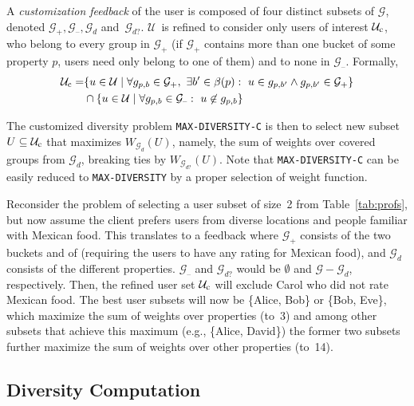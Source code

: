 A \emph{customization feedback} of the user is composed of four distinct subsets of $\mathcal{G}$, denoted $\mathcal{G}_{+},\mathcal{G}_{\textrm{--}},\mathcal{G}_{d}$ and~$\mathcal{G}_{d?}$. $\mathcal{U}$~is refined to consider only users of interest $\mathcal{U}_{\operatorname{c}}$, who belong to every group in  $\mathcal{G}_{+}$ (if $\mathcal{G}_{+}$ contains more than one bucket of some property $p$, users need only belong to one of them) and to none in $\mathcal{G}_{\textrm{--}}$. Formally,
\[\begin{split}
\mathcal{U}_{\operatorname{c}} = & \{u\in\mathcal{U}\mid\forall g_{p,b}\in \mathcal{G}_{+}, ~\exists b'\in \beta(p): ~u\in g_{p,b'} \wedge g_{p,b'} \in\mathcal{G}_{+}\} \\
& \cap  \{u\in\mathcal{U}\mid\forall g_{p,b}\in \mathcal{G}_{\textrm{--}} : ~u\not\in g_{p,b}\}
\end{split}\]

The customized diversity problem  \texttt{MAX-DIVERSITY-C} is then to select new subset $U\subseteq\mathcal{U}_{\operatorname{c}}$ that maximizes $W_{\mathcal{G}_{d}}(U)$, namely, the sum of weights over covered groups from  $\mathcal{G}_{d}$, breaking ties by $W_{\mathcal{G}_{d?}}(U)$. Note that \texttt{MAX-DIVERSITY-C} can be easily reduced to \texttt{MAX-DIVERSITY} by a proper selection of weight function.

\begin{example}
	Reconsider the problem of selecting a user subset of size~2 from Table~\ref{tab:profs}, but now assume the client prefers users from diverse locations and people familiar with Mexican food. This translates to a feedback where $\mathcal{G}_{+}$ consists of the two buckets  and  of  (requiring the users to have any rating for Mexican food), and $\mathcal{G}_{d}$ consists of the different  properties. $\mathcal{G}_{\textrm{--}}$ and $\mathcal{G}_{d?}$ would be $\emptyset$ and $\mathcal{G}-\mathcal{G}_d$, respectively. Then, the refined user set $\mathcal{U}_{\operatorname{c}}$ will exclude Carol who did not rate Mexican food. The best user subsets will now be \{Alice, Bob\} or \{Bob, Eve\}, which maximize the sum of weights over  properties (to~3) and among other subsets that achieve this maximum (e.g., \{Alice, David\})  the former two subsets further maximize the sum of weights over other properties (to~14).
\end{example}


\subsection{Diversity Computation}
\label{sec:compute}


